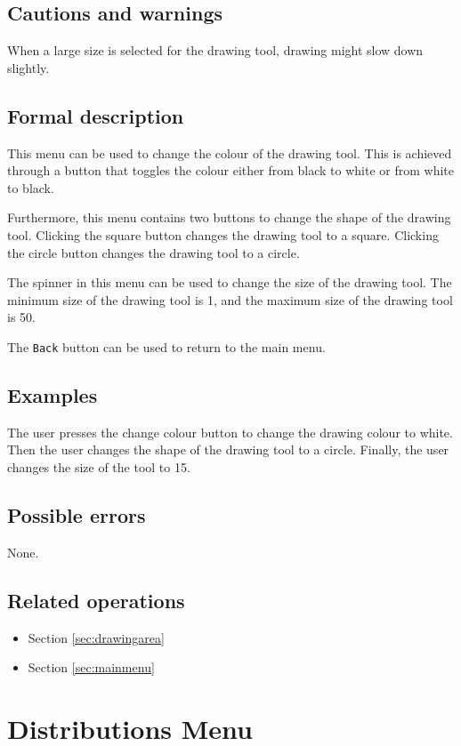   \subsection*{Cautions and warnings}
  When a large size is selected for the drawing tool, drawing might slow down slightly.

  \subsection*{Formal description}
  This menu can be used to change the colour of the drawing tool. This is achieved through a button that toggles the colour either from black to white or from white to black.
  
  Furthermore, this menu contains two buttons to change the shape of the drawing tool. Clicking the square button changes the drawing tool to a square. Clicking the circle button changes the drawing tool to a circle.
  
  The spinner in this menu can be used to change the size of the drawing tool. The minimum size of the drawing tool is 1, and the maximum size of the drawing tool is 50.
  
  The \texttt{Back} button can be used to return to the main menu.

  \subsection*{Examples}
  The user presses the change colour button to change the drawing colour to white. Then the user changes the shape of the drawing tool to a circle. Finally, the user changes the size of the tool to 15.

  \subsection*{Possible errors}
  None.

  \subsection*{Related operations}
  \begin{itemize}
  \item Section \ref{sec:drawingarea}
    \item Section \ref{sec:mainmenu}
  \end{itemize}

\section{Distributions Menu}\label{sec:distmenu}
